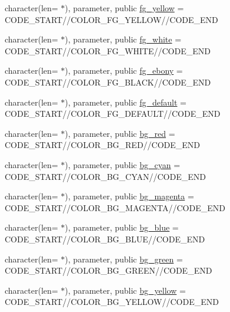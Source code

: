 \begin{DoxyCompactItemize}
character(len= $\ast$), parameter, public \mbox{\hyperlink{namespacem__escape_a9902f29abc8261843e6b317cd07368ec}{fg\+\_\+yellow}} = C\+O\+D\+E\+\_\+\+S\+T\+A\+RT//C\+O\+L\+O\+R\+\_\+\+F\+G\+\_\+\+Y\+E\+L\+L\+OW//C\+O\+D\+E\+\_\+\+E\+ND
\item 
character(len= $\ast$), parameter, public \mbox{\hyperlink{namespacem__escape_adde79fd804c7dffee08721f5a360345c}{fg\+\_\+white}} = C\+O\+D\+E\+\_\+\+S\+T\+A\+RT//C\+O\+L\+O\+R\+\_\+\+F\+G\+\_\+\+W\+H\+I\+TE//C\+O\+D\+E\+\_\+\+E\+ND
\item 
character(len= $\ast$), parameter, public \mbox{\hyperlink{namespacem__escape_a7b93e25003e389c21833a5ca8605d2de}{fg\+\_\+ebony}} = C\+O\+D\+E\+\_\+\+S\+T\+A\+RT//C\+O\+L\+O\+R\+\_\+\+F\+G\+\_\+\+B\+L\+A\+CK//C\+O\+D\+E\+\_\+\+E\+ND
\item 
character(len= $\ast$), parameter, public \mbox{\hyperlink{namespacem__escape_a518f003512a7505cb8bf9585c103900e}{fg\+\_\+default}} = C\+O\+D\+E\+\_\+\+S\+T\+A\+RT//C\+O\+L\+O\+R\+\_\+\+F\+G\+\_\+\+D\+E\+F\+A\+U\+LT//C\+O\+D\+E\+\_\+\+E\+ND
\item 
character(len= $\ast$), parameter, public \mbox{\hyperlink{namespacem__escape_a3cd9ef6cdd5ab3dda36cc9402dff0806}{bg\+\_\+red}} = C\+O\+D\+E\+\_\+\+S\+T\+A\+RT//C\+O\+L\+O\+R\+\_\+\+B\+G\+\_\+\+R\+ED//C\+O\+D\+E\+\_\+\+E\+ND
\item 
character(len= $\ast$), parameter, public \mbox{\hyperlink{namespacem__escape_a7b7a979cd6dc44533f962d323c65a7b6}{bg\+\_\+cyan}} = C\+O\+D\+E\+\_\+\+S\+T\+A\+RT//C\+O\+L\+O\+R\+\_\+\+B\+G\+\_\+\+C\+Y\+AN//C\+O\+D\+E\+\_\+\+E\+ND
\item 
character(len= $\ast$), parameter, public \mbox{\hyperlink{namespacem__escape_aaf244507d267d0ae99ea933a8744c7e4}{bg\+\_\+magenta}} = C\+O\+D\+E\+\_\+\+S\+T\+A\+RT//C\+O\+L\+O\+R\+\_\+\+B\+G\+\_\+\+M\+A\+G\+E\+N\+TA//C\+O\+D\+E\+\_\+\+E\+ND
\item 
character(len= $\ast$), parameter, public \mbox{\hyperlink{namespacem__escape_afab2229302287eaa0eb05add07bb6621}{bg\+\_\+blue}} = C\+O\+D\+E\+\_\+\+S\+T\+A\+RT//C\+O\+L\+O\+R\+\_\+\+B\+G\+\_\+\+B\+L\+UE//C\+O\+D\+E\+\_\+\+E\+ND
\item 
character(len= $\ast$), parameter, public \mbox{\hyperlink{namespacem__escape_a5754e4af92f738d3fd7c95daeaa7f2e1}{bg\+\_\+green}} = C\+O\+D\+E\+\_\+\+S\+T\+A\+RT//C\+O\+L\+O\+R\+\_\+\+B\+G\+\_\+\+G\+R\+E\+EN//C\+O\+D\+E\+\_\+\+E\+ND
\item 
character(len= $\ast$), parameter, public \mbox{\hyperlink{namespacem__escape_afe23b71a7646ac88c8c74358994f92d0}{bg\+\_\+yellow}} = C\+O\+D\+E\+\_\+\+S\+T\+A\+RT//C\+O\+L\+O\+R\+\_\+\+B\+G\+\_\+\+Y\+E\+L\+L\+OW//C\+O\+D\+E\+\_\+\+E\+ND

\end{DoxyCompactItemize}
